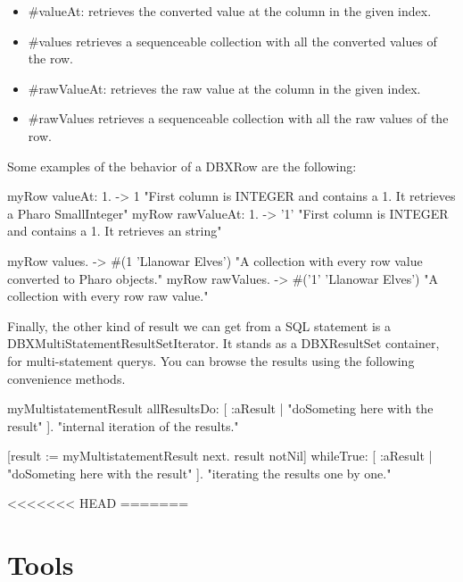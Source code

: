 \documentclass[a4paper,10pt,twoside]{book}
\begin{document}
\begin{itemize}
    \item \#valueAt: retrieves the converted value at the column in the given index.
    \item \#values retrieves a sequenceable collection with all the converted values of the row.
    \item \#rawValueAt: retrieves the raw value at the column in the given index.
    \item \#rawValues retrieves a sequenceable collection with all the raw values of the row.
\end{itemize}

Some examples of the behavior of a DBXRow are the following:
\begin{code}{}
myRow valueAt: 1. -> 1          "First column is INTEGER and contains a 1. It retrieves a Pharo SmallInteger"
myRow rawValueAt: 1. -> '1'     "First column is INTEGER and contains a 1. It retrieves an string"

myRow values.    -> #(1 'Llanowar Elves')   "A collection with every row value converted to Pharo objects."
myRow rawValues. -> #('1' 'Llanowar Elves') "A collection with every row raw value."
\end{code}


Finally, the other kind of result we can get from a SQL statement is a DBXMultiStatementResultSetIterator.  It stands as a DBXResultSet container, for multi-statement querys.  You can browse the results using the following convenience methods.

\begin{code}{}
myMultistatementResult allResultsDo: [ :aResult | "doSometing here with the result" ].  "internal iteration of the results."

[result := myMultistatementResult next. result notNil] 
    whileTrue: [ :aResult | "doSometing here with the result" ].  "iterating the results one by one."
\end{code}

<<<<<<< HEAD
=======

\section{Tools}
\end{document}
